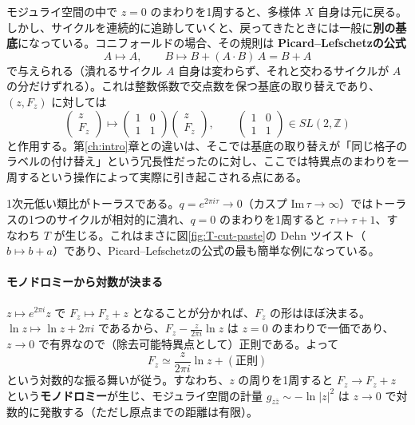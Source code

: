 \documentclass[uplatex, dvipdfmx, book]{jsbook}
\begin{document}
モジュライ空間の中で $z = 0$ のまわりを1周すると、多様体 $X$ 自身は元に戻る。しかし、サイクルを連続的に追跡していくと、戻ってきたときには一般に\textbf{別の基底}になっている。コニフォールドの場合、その規則は \textbf{Picard--Lefschetzの公式}
\begin{equation*}
    A \mapsto A, \qquad B \mapsto B + (A \cdot B)\, A = B + A
\end{equation*}
で与えられる（潰れるサイクル $A$ 自身は変わらず、それと交わるサイクルが $A$ の分だけずれる）。これは整数係数で交点数を保つ基底の取り替えであり、$(z, F_z)$ に対しては
\begin{equation*}
    \begin{pmatrix} z \\ F_z \end{pmatrix} \mapsto \begin{pmatrix} 1 & 0 \\ 1 & 1 \end{pmatrix} \begin{pmatrix} z \\ F_z \end{pmatrix}, \qquad \begin{pmatrix} 1 & 0 \\ 1 & 1 \end{pmatrix} \in SL(2, \mathbb{Z})
\end{equation*}
と作用する。第\ref{ch:intro}章との違いは、そこでは基底の取り替えが「同じ格子のラベルの付け替え」という冗長性だったのに対し、ここでは特異点のまわりを一周するという操作によって実際に引き起こされる点にある。

1次元低い類比がトーラスである。$q = e^{2\pi i\tau} \to 0$（カスプ $\mathrm{Im}\,\tau \to \infty$）ではトーラスの1つのサイクルが相対的に潰れ、$q = 0$ のまわりを1周すると $\tau \mapsto \tau + 1$、すなわち $T$ が生じる。これはまさに図\ref{fig:T-cut-paste}の Dehn ツイスト（$b \mapsto b + a$）であり、Picard--Lefschetzの公式の最も簡単な例になっている。

\paragraph{モノドロミーから対数が決まる}
$z \mapsto e^{2\pi i}z$ で $F_z \mapsto F_z + z$ となることが分かれば、$F_z$ の形はほぼ決まる。$\ln z \mapsto \ln z + 2\pi i$ であるから、$F_z - \frac{z}{2\pi i}\ln z$ は $z = 0$ のまわりで一価であり、$z \to 0$ で有界なので（除去可能特異点として）正則である。よって
\begin{equation}
    F_z \simeq \frac{z}{2\pi i}\ln z + (\text{正則})
\end{equation}
という対数的な振る舞いが従う。すなわち、$z$ の周りを1周すると $F_z \to F_z + z$ という\textbf{モノドロミー}が生じ、モジュライ空間の計量 $g_{z\bar z} \sim -\ln|z|^2$ は $z \to 0$ で対数的に発散する（ただし原点までの距離は有限）。
\end{document}
